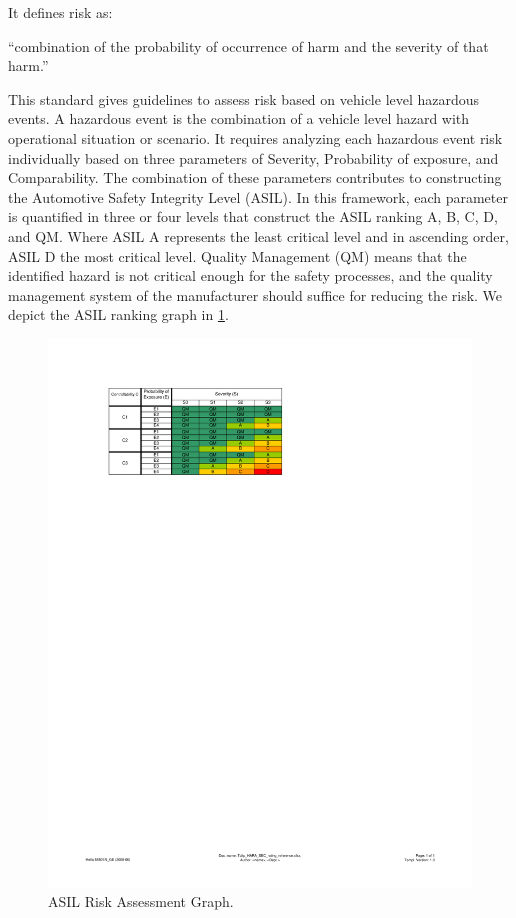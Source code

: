 It defines risk as:
\begin{definition}
	``combination of the probability of occurrence of harm and the severity of that harm.'' 
\end{definition}

This standard gives guidelines to assess risk based on vehicle level hazardous events. A hazardous event is the combination of a vehicle level hazard with operational situation or scenario. It requires analyzing each hazardous event risk individually based on three parameters of Severity, Probability of exposure, and Comparability. The combination of these parameters contributes to constructing the Automotive Safety Integrity Level (ASIL). In this framework, each parameter is quantified in three or four levels that construct the ASIL ranking A, B, C, D, and QM. Where ASIL A represents the least critical level and in ascending order, ASIL D the most critical level. Quality Management (QM) means that the identified hazard is not critical enough for the safety processes, and the quality management system of the manufacturer should suffice for reducing the risk. We depict the ASIL ranking graph in \cref{Fig:ASILGraph}. 

\begin{figure}
	\centering
	\includegraphics[width=0.9\linewidth]{./figures/ASIL}
	\caption{ASIL Risk Assessment Graph.}
	\label{Fig:ASILGraph}
\end{figure}

